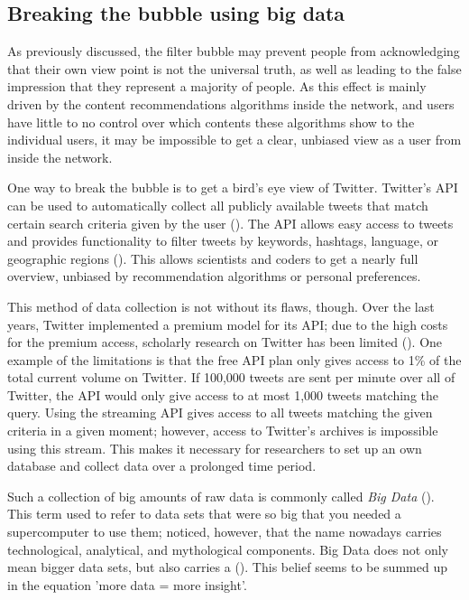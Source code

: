 
\subsection{Breaking the bubble using big data}
As previously discussed, the filter bubble may prevent people from acknowledging that their own view point is not the universal truth, as well as leading to the false impression that they represent a majority of people. As this effect is mainly driven by the content recommendations algorithms inside the network, and users have little to no control over which contents these algorithms show to the individual users, it may be impossible to get a clear, unbiased view as a user from inside the network.

One way to break the bubble is to get a bird's eye view of Twitter. Twitter's API can be used to automatically collect all publicly available tweets that match certain search criteria given by the user (\cite{twitterinc.TwitterAPIs}). The API allows easy access to tweets and provides functionality to filter tweets by keywords, hashtags, language, or geographic regions (\cite{bello2017detecting}). This allows scientists and coders to get a nearly full overview, unbiased by recommendation algorithms or personal preferences.

This method of data collection is not without its flaws, though. Over the last years, Twitter implemented a premium model for its API; due to the high costs for the premium access, scholarly research on Twitter has been limited (\cite{brunsTwitterDataWhat2014}). One example of the limitations is that the free API plan only gives access to 1\% of the total current volume on Twitter. If 100,000 tweets are sent per minute over all of Twitter, the API would only give access to at most 1,000 tweets matching the query. Using the streaming API gives access to all tweets matching the given criteria in a given moment; however, access to Twitter's archives is impossible using this stream. This makes it necessary for researchers to set up an own database and collect data over a prolonged time period.

Such a collection of big amounts of raw data is commonly called \emph{Big Data} (\cite{crawfordCriticalQuestionsBig2012}). This term used to refer to data sets that were so big that you needed a supercomputer to use them; \citeauthor{crawfordCriticalQuestionsBig2012} noticed, however, that the name nowadays carries technological, analytical, and mythological components. Big Data does not only mean bigger data sets, but also carries a  (\cite[3]{crawfordCriticalQuestionsBig2012}). This belief seems to be summed up in the equation 'more data = more insight'.

